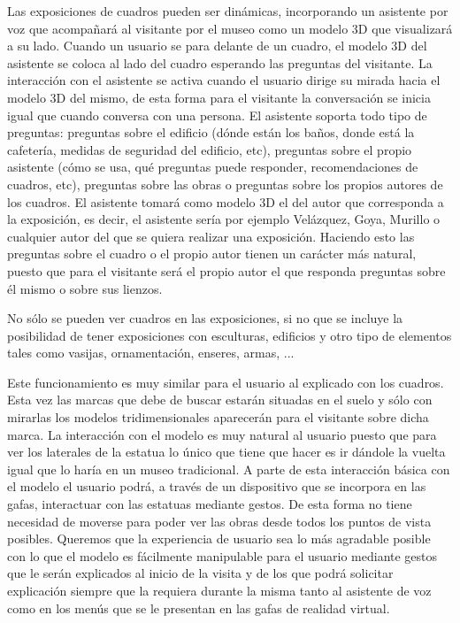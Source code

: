 \documentclass[a4paper,11pt]{article}
\begin{document}
Las exposiciones de cuadros pueden ser dinámicas, incorporando un asistente por voz que acompañará al visitante por el museo como un modelo 3D que visualizará a su lado. Cuando un usuario se para delante de un cuadro, el modelo 3D del asistente se coloca al lado del cuadro esperando las preguntas del visitante. La interacción con el asistente se activa cuando el usuario dirige su mirada hacia el modelo 3D del mismo, de esta forma para el visitante la conversación se inicia igual que cuando conversa con una persona. El asistente soporta todo tipo de preguntas: preguntas sobre el edificio (dónde están los baños, donde está la cafetería, medidas de seguridad del edificio, etc), preguntas sobre el propio asistente (cómo se usa, qué preguntas puede responder, recomendaciones de cuadros,  etc), preguntas sobre las obras o preguntas sobre los propios autores de los cuadros. El asistente tomará como modelo 3D el del autor que corresponda a la exposición, es decir, el asistente sería por ejemplo Velázquez, Goya, Murillo o cualquier autor del que se quiera realizar una exposición. Haciendo esto las preguntas sobre el cuadro o el propio autor tienen un carácter más natural, puesto que para el visitante será el propio autor el que responda preguntas sobre él mismo o sobre sus lienzos.

No sólo se pueden ver cuadros en las exposiciones, si no que se incluye la posibilidad de tener exposiciones con esculturas, edificios y otro tipo de elementos tales como vasijas, ornamentación, enseres, armas, ...

Este funcionamiento es muy similar para el usuario al explicado con los cuadros. Esta vez las marcas que debe de buscar estarán situadas en el suelo y sólo con mirarlas los modelos tridimensionales aparecerán para el visitante sobre dicha marca. La interacción con el modelo es muy natural al usuario puesto que para ver los laterales de la estatua lo único que tiene que hacer es ir dándole la vuelta igual que lo haría en un museo tradicional. A parte de esta interacción básica con el modelo el usuario podrá, a través de un dispositivo que se incorpora en las gafas, interactuar con las estatuas mediante gestos. De esta forma no tiene necesidad de moverse para poder ver las obras desde todos los puntos de vista posibles. Queremos que la experiencia de usuario sea lo más agradable posible con lo que el modelo es fácilmente manipulable para el usuario mediante gestos que le serán explicados al inicio de la visita y de los que podrá solicitar explicación siempre que la requiera durante la misma tanto al asistente de voz como en los menús que se le presentan en las gafas de realidad virtual.
\end{document}
